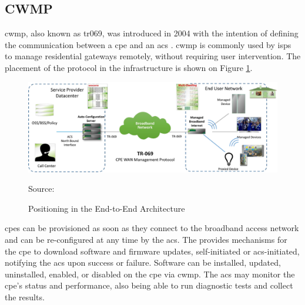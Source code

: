 \subsection{CWMP}

\gls{cwmp}, also known as \gls{tr069}, was introduced in 2004 with the intention of defining the communication between a \gls{cpe} and an \gls{acs} \cite{tr069}. \gls{cwmp} is commonly used by \glspl{isp} to manage residential gateways remotely, without requiring user intervention. The placement of the protocol in the infrastructure is shown on Figure \ref{figure:tr069_figure1}.

\begin{figure}[h]
    \centering
    \includegraphics[width=\linewidth]{contents/background-in-isp-side-protocols/cwmp/positioning-in-the-e2e-architecture.png}
    \caption{Positioning in the End-to-End Architecture}
    {Source: \cite{tr069}}
    \label{figure:tr069_figure1}
\end{figure}

\glspl{cpe} can be provisioned as soon as they connect to the broadband access network and can be re-configured at any time by the \gls{acs}. The provides mechanisms for the \gls{cpe} to download software and firmware updates, self-initiated or \gls{acs}-initiated, notifying the \gls{acs} upon success or failure. Software can be installed, updated, uninstalled, enabled, or disabled on the \gls{cpe} via \gls{cwmp}. The \gls{acs} may monitor the \gls{cpe}'s status and performance, also being able to run diagnostic tests and collect the results.

\FloatBarrier
